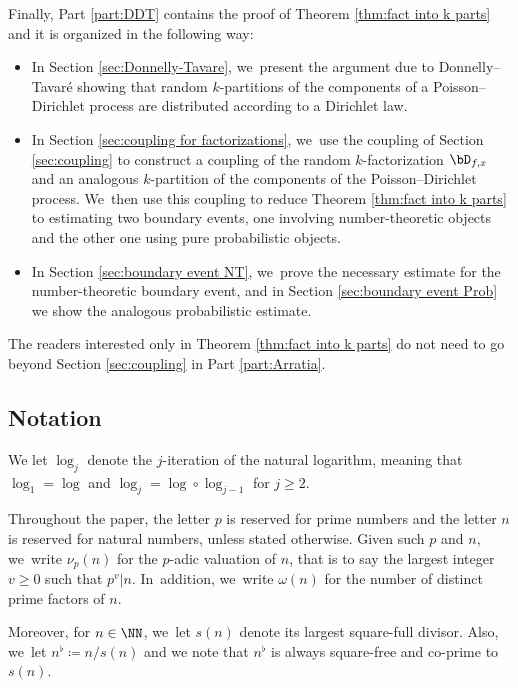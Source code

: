 Finally, Part \ref{part:DDT} contains the proof of Theorem \ref{thm:fact into k parts} and it is organized in the following way:
\begin{itemize}
\item In Section \ref{sec:Donnelly-Tavare}, we~present the argument due to Donnelly--Tavaré showing that random $k$-partitions of the components of a Poisson--Dirichlet process are distributed according to a Dirichlet law.

\item In Section \ref{sec:coupling for factorizations}, we~use the coupling of Section \ref{sec:coupling} to construct a coupling of the random $k$-factorization $\bD_{f, x}$ and an analogous $k$-partition of the components of the Poisson--Dirichlet process. We~then use this coupling to reduce Theorem \ref{thm:fact into k parts} to estimating two boundary events, one involving number-theoretic objects and the other one using pure probabilistic objects.

\item In Section \ref{sec:boundary event NT}, we~prove the necessary estimate for the number-theoretic boundary event, and in Section \ref{sec:boundary event Prob} we show the analogous probabilistic estimate.
\end{itemize}

\begin{rems}
The readers interested only in Theorem \ref{thm:fact into k parts} do not need to go beyond Section \ref{sec:coupling} in Part \ref{part:Arratia}.
\end{rems}

\subsection{Notation}
We let $\log_j$ denote the $j$-iteration of the natural logarithm, meaning that $\log_1=\log$ and $\log_j=\log\circ \log_{j-1}$ for $j\ge2$.

Throughout the paper, the letter $p$ is reserved for prime numbers and the letter $n$ is reserved for natural numbers, unless stated otherwise. Given such $p$ and $n$, we~write $\nu_p(n)$ for the $p$-adic valuation of $n$, that is to say the largest integer $v\ge0$ such that $p^v|n$. In~addition, we~write $\omega(n)$ for the number of distinct prime factors of $n$.

Moreover, for $n\in\NN$, we~let $s(n)$ denote its largest square-full divisor. Also, we~let $n^\flat \coloneqq n/s(n)$ and we note that $n^\flat$ is always square-free and co-prime to $s(n)$.

